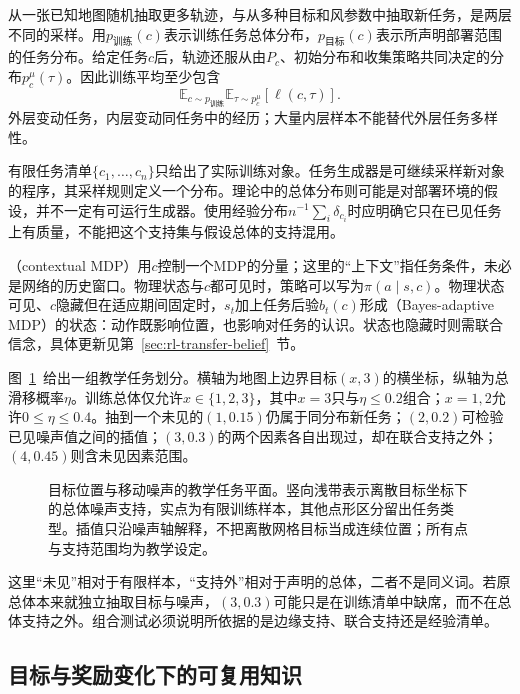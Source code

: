 从一张已知地图随机抽取更多轨迹，与从多种目标和风参数中抽取新任务，是两层不同的采样。用$p_{\text{训练}}(c)$表示训练任务总体分布，$p_{\text{目标}}(c)$表示所声明部署范围的任务分布。给定任务$c$后，轨迹还服从由$P_c$、初始分布和收集策略共同决定的分布$p_c^\mu(\tau)$。因此训练平均至少包含
\[
  \mathbb E_{c\sim p_{\text{训练}}}
  \mathbb E_{\tau\sim p_c^\mu}[\ell(c,\tau)].
\]
外层变动任务，内层变动同任务中的经历；大量内层样本不能替代外层任务多样性。

有限任务清单$\{c_1,\ldots,c_n\}$只给出了实际训练对象。任务生成器是可继续采样新对象的程序，其采样规则定义一个分布。理论中的总体分布则可能是对部署环境的假设，并不一定有可运行生成器。使用经验分布$n^{-1}\sum_i\delta_{c_i}$时应明确它只在已见任务上有质量，不能把这个支持集与假设总体的支持混用。

（contextual MDP）用$c$控制一个MDP的分量；这里的“上下文”指任务条件，未必是网络的历史窗口。物理状态与$c$都可见时，策略可以写为$\pi(a\mid s,c)$。物理状态可见、$c$隐藏但在适应期间固定时，$s_t$加上任务后验$b_t(c)$形成（Bayes-adaptive MDP）的状态：动作既影响位置，也影响对任务的认识。状态也隐藏时则需联合信念，具体更新见第~\ref{sec:rl-transfer-belief}~节。

图~\ref{fig:rl-transfer-task-plane}~给出一组教学任务划分。横轴为地图上边界目标$(x,3)$的横坐标，纵轴为总滑移概率$\eta$。训练总体仅允许$x\in\{1,2,3\}$，其中$x=3$只与$\eta\leq0.2$组合；$x=1,2$允许$0\leq\eta\leq0.4$。抽到一个未见的$(1,0.15)$仍属于同分布新任务；$(2,0.2)$可检验已见噪声值之间的插值；$(3,0.3)$的两个因素各自出现过，却在联合支持之外；$(4,0.45)$则含未见因素范围。

\begin{figure}[htbp]
  \centering
  
  \caption{目标位置与移动噪声的教学任务平面。竖向浅带表示离散目标坐标下的总体噪声支持，实点为有限训练样本，其他点形区分留出任务类型。插值只沿噪声轴解释，不把离散网格目标当成连续位置；所有点与支持范围均为教学设定。}
  \label{fig:rl-transfer-task-plane}
\end{figure}

这里“未见”相对于有限样本，“支持外”相对于声明的总体，二者不是同义词。若原总体本来就独立抽取目标与噪声，$(3,0.3)$可能只是在训练清单中缺席，而不在总体支持之外。组合测试必须说明所依据的是边缘支持、联合支持还是经验清单。

\subsection{目标与奖励变化下的可复用知识}
\label{sec:rl-transfer-reward-change}

